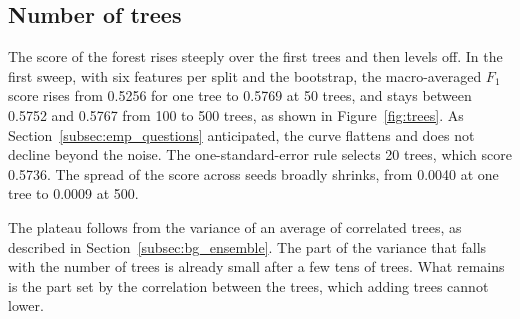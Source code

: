 \documentclass[conference,10pt]{IEEEtran}
\begin{document}
\subsection{Number of trees}
\label{subsec:res_trees}

The score of the forest rises steeply over the first trees and then levels
off. In the first sweep, with six features per split and the bootstrap, the
macro-averaged $F_1$ score rises from 0.5256 for one tree to 0.5769 at 50
trees, and stays between 0.5752 and 0.5767 from 100 to 500 trees, as shown in Figure~\ref{fig:trees}. As Section~\ref{subsec:emp_questions}
anticipated, the curve flattens and does not decline beyond the noise. The
one-standard-error rule selects 20 trees, which score 0.5736. The spread of the score across seeds broadly shrinks, from 0.0040 at one
tree to 0.0009 at 500.

The plateau follows from the variance of an average of correlated trees, as described in Section~\ref{subsec:bg_ensemble}. The part of the variance that falls
with the number of trees is already small after a few tens of trees. What
remains is the part set by the correlation between the trees, which adding
trees cannot lower.
\end{document}
